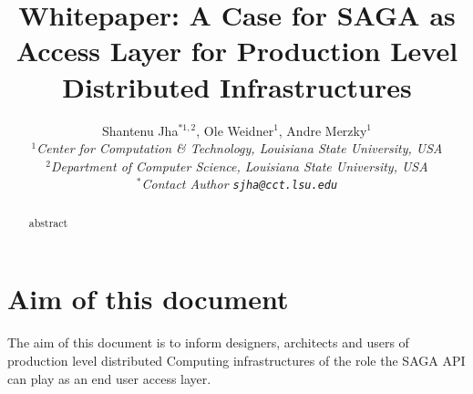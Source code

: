 \documentclass[3p,twocolumn]{article}
\begin{document}
\title{Whitepaper: A Case for SAGA as Access Layer for Production Level Distributed Infrastructures}

\author{Shantenu Jha$^{*1,2}$, Ole Weidner$^{1}$, Andre Merzky$^{1}$\\
  \small{\emph{$^{1}$Center for Computation \& Technology, Louisiana State University, USA}}\\
  \small{\emph{$^{2}$Department of Computer Science, Louisiana State University, USA}}\\
  \small{\emph{$^{*}$Contact Author \texttt{sjha@cct.lsu.edu}}}
  }

\newif\ifdraft
\drafttrue
\ifdraft
 \newcommand{\amnote}[1]{  {\textcolor{magenta} { ***AM: #1 }}}
 \newcommand{\jhanote}[1]{ {\textcolor{red}     { ***SJ: #1 }}}
 \newcommand{\olenote}[1]{ {\textcolor{blue}    { ***OW: #1 }}}
\else
 \newcommand{\amnote}[1]{}
 \newcommand{\jhanote}[1]{}
 \newcommand{\olenote}[1]{}
\fi

\newcommand{\dn}{\vspace*{0.33em}}
\newcommand{\dnn}{\vspace*{0.66em}}
\newcommand{\dnnn}{\vspace*{1em}}
\newcommand{\uppp}{\vspace*{-1em}}
\newcommand{\upp}{\vspace*{-0.66em}}
\newcommand{\up}{\vspace*{-0.33em}}
\newcommand{\shift}{\hspace*{1.00em}}

\newcommand{\T}[1]{\texttt{#1}}
\newcommand{\I}[1]{\textit{#1}}
\newcommand{\B}[1]{\textbf{#1}}
\newcommand{\BI}[1]{\B{\I{#1}}}
\newcommand{\F}[1]{\B{[FIXME: #1]}}
\newcommand{\TODO}[1]{\textcolor{red}{\B{TODO: #1}}}


\begin{abstract}
abstract
\end{abstract}
\maketitle



\section{Aim of this document}

 The aim of this document is to inform designers, architects and users
 of production level distributed Computing infrastructures of the role
 the SAGA API can play as an end user access layer.
\end{document}
